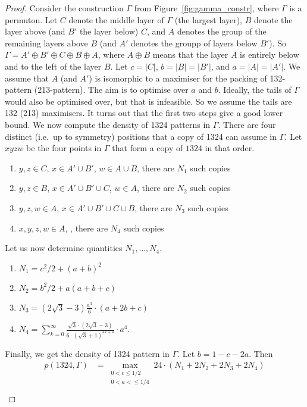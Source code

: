 \begin{proof}
  Consider the construction $\Gamma$ from Figure~\ref{fig:gamma_constr}, where $\Gamma$ is a permuton. Let $C$ denote the middle layer of $\Gamma$ (the largest layer), $B$ denote the layer above (and $B'$ the layer below) $C$, and $A$ denotes the group of the remaining layers above $B$ (and $A'$ denotes the groupp of layers below $B'$). So $\Gamma = A' \oplus B' \oplus C \oplus B \oplus A$, where $A \oplus B$ means that the layer $A$ is entirely below and to the left of the layer $B$. Let $c = |C|$, $b = |B| = |B'|$, and $a =  |A| = |A'|$. We assume that $A$ (and $A'$) is isomorphic to a maximiser for the packing of 132-pattern (213-pattern). The aim is to optimise over $a$ and $b$. Ideally, the tails of $\Gamma$ would also be optimised over, but that is infeasible. So we assume the tails are 132 (213) maximisers. It turns out that the first two steps give a good lower bound. We now compute the density of 1324 patterns in $\Gamma$. There are four distinct (i.e.~up to symmetry) positions that a copy of 1324 can assume in $\Gamma$. Let $xyzw$ be the four points in $\Gamma$ that form a copy of $1324$ in that order.
\begin{enumerate}
\item $y,z \in C$, $x \in A' \cup B'$, $w \in A \cup B$, there are $N_1$ such copies
\item $y,z \in B$, $x \in A' \cup B' \cup C$, $w \in A$, there are $N_2$ such copies
\item $y,z,w \in A$, $x \in A' \cup B' \cup C \cup B$, there are $N_3$ such copies
\item $x,y,z,w \in A$, , there are $N_4$ such copies
\end{enumerate}
Let us now determine quantities $N_1,\ldots, N_4$. 
\begin{enumerate}
\item $N_1 = c^2/2 + (a+b)^2$
\item $N_2 = b^2/2 + a(a+b+c)$
\item $N_3 = (2\sqrt{3}-3)\frac{a^3}{6}\cdot (a+2b+c)$
\item $N_4 = \sum_{k=0}^\infty \frac{\sqrt{3}\cdot(2\sqrt{3}-3)}{6 \cdot (\sqrt{3}+1)^{4k+4}}\cdot a^4$.
\end{enumerate}
Finally, we get the density of 1324 pattern in $\Gamma$. Let $b = 1-c-2a$. Then
\begin{align*}
p(1324, \Gamma) &= \max_{\substack{0< c\leq 1/2\\ 0 < a < \leq 1/4}}24\cdot(N_1 + 2N_2 + 2N_3 + 2N_4)\\

\end{align*}
\end{proof}
